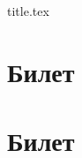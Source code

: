 \documentclass[12pt]{article}
\begin{document}
{title.tex}

\pagestyle{empty}
\tableofcontents
\clearpage

\pagestyle{headings}
\section{Билет}

\clearpage

\section{Билет}

\end{document}

